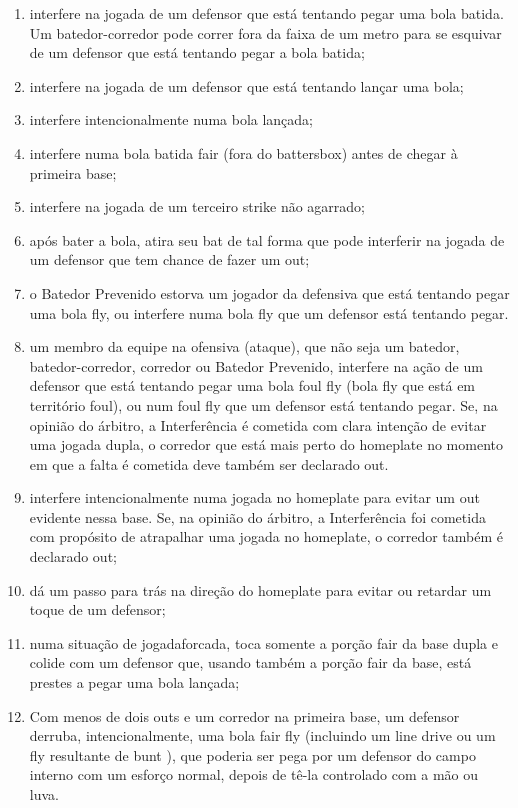 \begin{enumerate}[label=(\alph*)]
\begin{enumerate}[label=\roman*.]
		\item  interfere na jogada de um defensor que está tentando pegar uma bola batida. Um batedor-corredor pode correr fora da faixa de um metro para se esquivar de um defensor que está tentando pegar a bola batida;
		\item  interfere na jogada de um defensor que está tentando lançar uma bola;
		\item  interfere intencionalmente numa bola lançada;
		\item  interfere numa bola batida \gls{fair} (fora do \gls{battersbox}) antes de chegar à primeira base;
		\item  interfere na jogada de um terceiro \gls{strike} não agarrado;
		\item  após bater a bola, atira seu \gls{bat} de tal forma que pode interferir na jogada de um defensor que tem chance de fazer um \gls{out};
		\item  o Batedor Prevenido estorva um jogador da defensiva que está tentando pegar uma bola \gls{fly}, ou interfere numa bola \gls{fly} que um defensor está tentando pegar.
		\item  um membro da equipe na ofensiva (ataque), que não seja um batedor, batedor-corredor, corredor ou Batedor Prevenido, interfere na ação de um defensor que está tentando pegar uma bola \gls{foul fly} (bola \gls{fly} que está em território \gls{foul}), ou num \gls{foul fly} que um defensor está tentando pegar. Se, na  opinião do árbitro, a Interferência é cometida com clara intenção de evitar uma  jogada dupla, o corredor que está mais perto do \gls{homeplate} no momento em que a falta é cometida deve também ser declarado \gls{out}.
		\item  interfere intencionalmente numa jogada no \gls{homeplate} para evitar um \gls{out} evidente nessa base. Se, na opinião do árbitro, a Interferência foi cometida com propósito de atrapalhar uma jogada no \gls{homeplate}, o corredor também é declarado \gls{out};
		\item   dá um passo para trás na direção do \gls{homeplate} para evitar ou retardar um toque de um defensor;
		\item  numa situação de \gls{jogadaforcada}, toca somente a porção \gls{fair} da base dupla e colide com um defensor que, usando também a porção \gls{fair} da base, está prestes a pegar uma bola lançada;
		\item  Com menos de dois \glspl{out} e um corredor na primeira base, um defensor derruba, intencionalmente, uma bola \gls{fair fly} (incluindo um \gls{line drive} ou um \gls{fly} resultante de \gls{bunt} ), que poderia ser pega por um defensor do campo interno com um esforço normal, depois de tê-la controlado com a mão ou luva.

\end{enumerate}
\end{enumerate}
